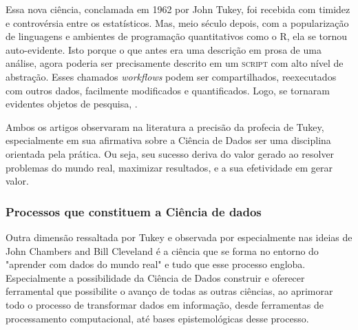 \documentclass{article}
\begin{document}
Essa nova ciência, conclamada em 1962 por John Tukey, foi recebida com timidez e controvérsia entre os estatísticos. Mas, meio século depois, com a popularização de linguagens e ambientes de programação quantitativos como o R\cite{ihaka1996r},  ela se tornou auto-evidente. Isto porque o que antes era uma descrição em prosa de uma análise, agora poderia ser precisamente descrito em um \textsc{script} com alto nível de abstração. Esses chamados \textit{workflows} podem ser compartilhados, reexecutados com outros dados, facilmente modificados e quantificados. Logo, se tornaram evidentes objetos de pesquisa, \cite{DONOHO}.

Ambos os artigos \cite{BATON,DONOHO} observaram na literatura a precisão da profecia de Tukey, especialmente em sua afirmativa sobre a Ciência de Dados ser uma disciplina orientada pela prática. Ou seja, seu sucesso deriva do valor gerado ao resolver problemas do mundo real, maximizar resultados, e a sua efetividade em gerar valor. 

\subsubsection{Processos que constituem a Ciência de dados}
Outra dimensão ressaltada por Tukey e observada por \cite{DONOHO} especialmente nas ideias de John Chambers\cite{CHAMBERS} and Bill Cleveland\cite{cleveland2001data} é a ciência que se forma no entorno do "aprender com dados do mundo real" e tudo que esse processo engloba. Especialmente a possibilidade da Ciência de Dados construir e oferecer ferramental que possibilite o avanço de todas as outras ciências, ao aprimorar todo o processo de transformar dados em informação, desde ferramentas de processamento computacional, até bases epistemológicas desse processo. 
\end{document}
